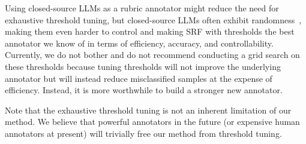 \documentclass{article}
\theoremstyle{plain}
\theoremstyle{definition}
\theoremstyle{remark}
\begin{document}
Using closed-source LLMs as a rubric annotator might reduce the need for exhaustive threshold tuning, but closed-source LLMs often exhibit randomness~\cite{random}, making them even harder to control and making SRF with thresholds the best annotator we know of in terms of efficiency, accuracy, and controllability. Currently, we do not bother and do not recommend conducting a grid search on these thresholds because tuning thresholds will not improve the underlying annotator but will instead reduce misclassified samples at the expense of efficiency. Instead, it is more worthwhile to build a stronger new annotator.

Note that the exhaustive threshold tuning is not an inherent limitation of our method. We believe that powerful annotators in the future (or expensive human annotators at present) will trivially free our method from threshold tuning.
\end{document}
